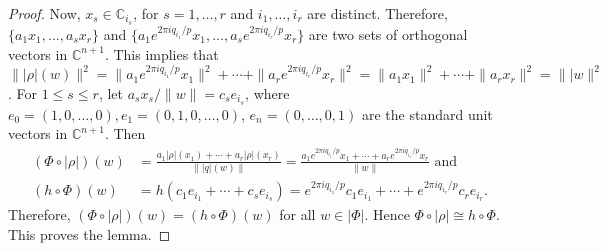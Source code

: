 \documentclass[10pt,a4paper]{amsart}
\begin{document}
\begin{proof}
\smallskip

Now, $x_s\in \mathbb{C}_{i_s}$, for $s=1,\dots, r$ and $i_1, \dots, i_r$ are distinct. Therefore, $\{a_1x_1, \dots, a_sx_r\}$ and $\{a_1e^{2\pi iq_{i_1}/p} x_1, \dots, a_se^{2\pi iq_{i_r}/p}x_r\}$ are two sets of orthogonal vectors in $\mathbb{C}^{n + 1}$. This implies that $\||\rho|(w)\|^2 = \|a_1e^{2\pi iq_{i_1}/p} x_1\|^2 + \cdots + \|a_re^{2\pi iq_{i_r}/p}x_r\|^2 = \|a_1x_1\|^2 + \cdots + \|a_rx_r\|^2=\||w\|^2$. For $1\leq s\leq r$, let $a_sx_s/\|w\|= c_se_{i_s}$, where $e_0=(1, 0, \dots, 0), e_1=(0, 1, 0, \dots, 0)$, $e_n=(0, \dots, 0, 1)$ are the standard unit vectors in $\mathbb{C}^{n+1}$. Then 
\begin{align*}
(\Phi\circ|\rho|)(w) & = \frac{a_1|\rho|(x_1) + \cdots + a_r|\rho|(x_r)}{\||q|(w)\|} = \frac{a_1e^{2\pi iq_{i_1}/p} x_1+ \cdots + a_re^{2\pi iq_{i_r}/p}x_r}{\|w\|}  \mbox{ and} \\
(h\circ\Phi)(w)& = h(c_1e_{i_1}+\cdots+c_se_{i_s}) = e^{2\pi i q_{i_1}/p}c_1e_{i_1}+\cdots+ e^{2\pi i q_{i_r}/p}c_re_{i_r}. 
\end{align*}
Therefore, $(\Phi\circ|\rho|)(w)= (h\circ\Phi)(w)$ for all $w\in |\Phi|$. Hence $\Phi\circ|\rho| \cong h\circ\Phi$. This proves the lemma. 
\end{proof}
\end{document}

